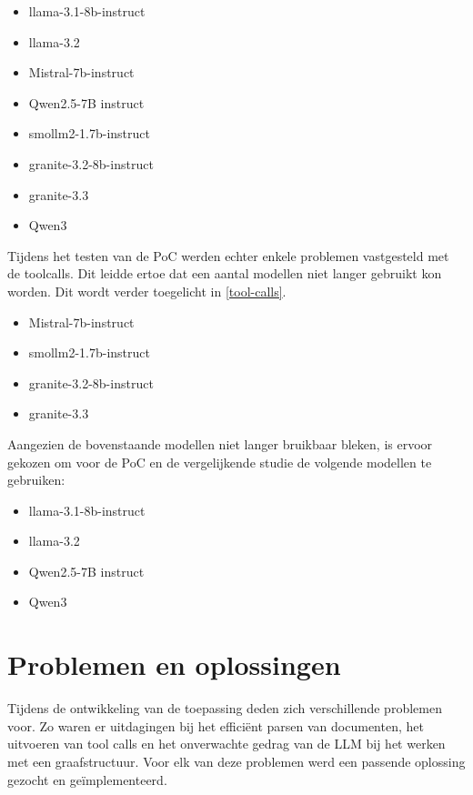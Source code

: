 \begin{itemize}
    \item llama-3.1-8b-instruct
    \item llama-3.2
    \item Mistral-7b-instruct
    \item Qwen2.5-7B instruct
    \item smollm2-1.7b-instruct
    \item granite-3.2-8b-instruct
    \item granite-3.3
    \item Qwen3
\end{itemize}

Tijdens het testen van de PoC werden echter enkele problemen vastgesteld met de toolcalls. Dit leidde ertoe dat een aantal modellen niet langer gebruikt kon worden. Dit wordt verder toegelicht in \ref{tool-calls}.

\begin{itemize}
    \item Mistral-7b-instruct
    \item smollm2-1.7b-instruct
    \item granite-3.2-8b-instruct
    \item granite-3.3
\end{itemize}

Aangezien de bovenstaande modellen niet langer bruikbaar bleken, is ervoor gekozen om voor de PoC en de vergelijkende studie de volgende modellen te gebruiken:

\begin{itemize}
    \item llama-3.1-8b-instruct
    \item llama-3.2
    \item Qwen2.5-7B instruct
    \item Qwen3
\end{itemize}


\section{Problemen en oplossingen}

Tijdens de ontwikkeling van de toepassing deden zich verschillende problemen voor. Zo waren er uitdagingen bij het efficiënt parsen van documenten, het uitvoeren van tool calls en het onverwachte gedrag van de LLM bij het werken met een graafstructuur. Voor elk van deze problemen werd een passende oplossing gezocht en geïmplementeerd.

